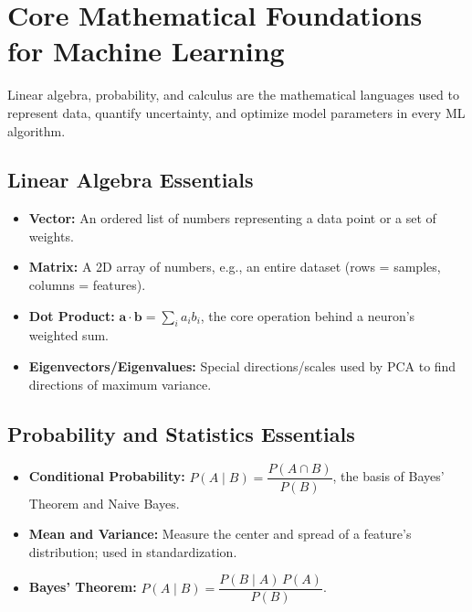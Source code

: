 \documentclass[11pt,a4paper]{article}
\begin{document}
\section{Core Mathematical Foundations for Machine Learning}

\begin{definitionbox}
Linear algebra, probability, and calculus are the mathematical languages used to represent data, quantify uncertainty, and optimize model parameters in every ML algorithm.
\end{definitionbox}

\subsection{Linear Algebra Essentials}
\begin{itemize}[leftmargin=*]
  \item \textbf{Vector:} An ordered list of numbers representing a data point or a set of weights.
  \item \textbf{Matrix:} A 2D array of numbers, e.g., an entire dataset (rows = samples, columns = features).
  \item \textbf{Dot Product:} $\mathbf{a}\cdot\mathbf{b} = \sum_i a_i b_i$, the core operation behind a neuron's weighted sum.
  \item \textbf{Eigenvectors/Eigenvalues:} Special directions/scales used by PCA to find directions of maximum variance.
\end{itemize}

\subsection{Probability and Statistics Essentials}
\begin{itemize}[leftmargin=*]
  \item \textbf{Conditional Probability:} $P(A\mid B) = \dfrac{P(A \cap B)}{P(B)}$, the basis of Bayes' Theorem and Naive Bayes.
  \item \textbf{Mean and Variance:} Measure the center and spread of a feature's distribution; used in standardization.
  \item \textbf{Bayes' Theorem:} $P(A\mid B) = \dfrac{P(B\mid A)\,P(A)}{P(B)}$.
\end{itemize}
\end{document}
